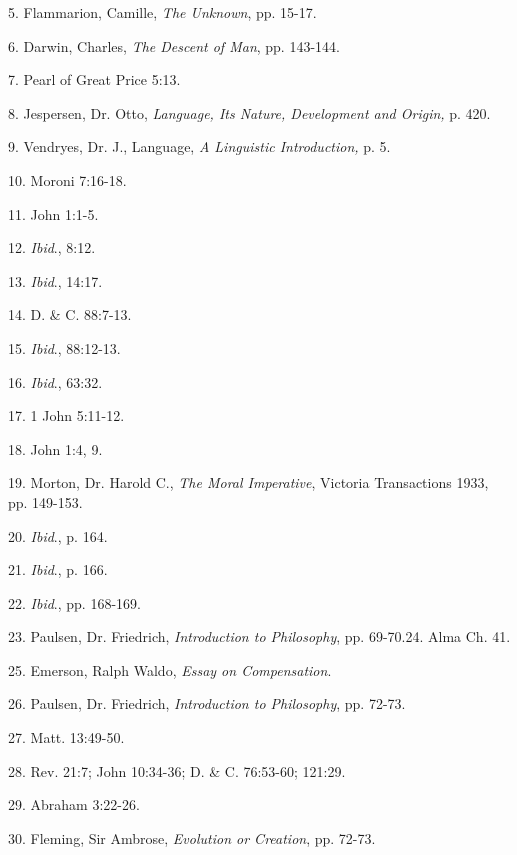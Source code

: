 5. Flammarion, Camille, \textit{The Unknown}, pp. 15-17.

6. Darwin, Charles, \textit{The Descent of Man}, pp. 143-144.

7. Pearl of Great Price 5:13.

8. Jespersen, Dr. Otto, \textit{Language, Its Nature, Development and Origin,} p. 420.

9. Vendryes, Dr. J., Language, \textit{A Linguistic Introduction,} p. 5.

10. Moroni 7:16-18.

11. John 1:1-5.

12. \textit{Ibid}., 8:12.

13. \textit{Ibid}., 14:17.

14. D. \& C. 88:7-13.

15. \textit{Ibid}., 88:12-13.

16. \textit{Ibid}., 63:32.

17. 1 John 5:11-12.

18. John 1:4, 9.

19. Morton, Dr. Harold C., \textit{The Moral Imperative}, Victoria Transactions 1933, pp. 149-153.

20. \textit{Ibid}., p. 164.

21. \textit{Ibid}., p. 166.

22. \textit{Ibid}., pp. 168-169.

23. Paulsen, Dr. Friedrich, \textit{Introduction to Philosophy}, pp. 69-70.24. Alma Ch. 41.

25. Emerson, Ralph Waldo, \textit{Essay on Compensation}.

26. Paulsen, Dr. Friedrich, \textit{Introduction to Philosophy}, pp. 72-73.

27. Matt. 13:49-50.

28. Rev. 21:7; John 10:34-36; D. \& C. 76:53-60; 121:29.

29. Abraham 3:22-26.

30. Fleming, Sir Ambrose, \textit{Evolution or Creation}, pp. 72-73.

